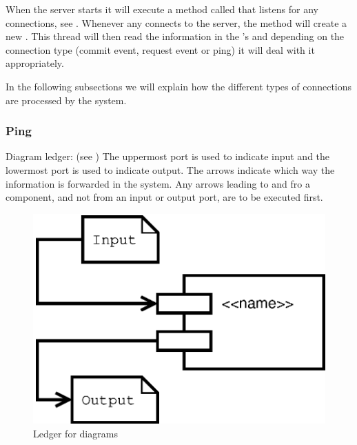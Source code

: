 When the server starts it will execute a method called  that listens for any connections, see .
Whenever any  connects to the server, the  method will create a new .
This thread will then read the information in the 's  and depending on the connection type (commit event, request event or ping) it will deal with it appropriately.



In the following subsections we will explain how the different types of connections are processed by the system.


\subsubsection{Ping}
\label{sec:IOPing}

Diagram ledger: (see )\newline
The uppermost port is used to indicate input and the lowermost port is used to indicate output. The arrows indicate which way the information is forwarded in the system. Any arrows leading to and fro a component, and not from an input or output port, are to be executed first.	\newline
\begin{figure}[H]
	\centering
		\includegraphics[scale=0.40]{images/ledger.eps}
	\caption{Ledger for diagrams}
	\label{fig:IOLedger}
\end{figure}

